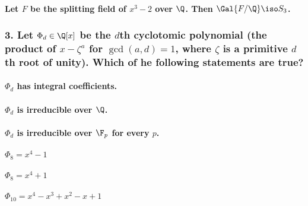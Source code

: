 \paragraph*{Let $F$ be the splitting field of $x^3 - 2$ over $\Q$. Then $\Gal{F / \Q} \iso S_3$.}

\subsubsection*{3. Let $\Phi_d \in \Q[x]$ be the $d$th cyclotomic polynomial (the product of $x - \zeta^a$ for $\gcd(a, d) = 1$, where $\zeta$ is a primitive $d$th root of unity). Which of he following statements are true?}

\paragraph*{$\Phi_d$ has integral coefficients.}

\paragraph*{$\Phi_d$ is irreducible over $\Q$.}

\paragraph*{$\Phi_d$ is irreducible over $\F_p$ for every $p$.}

\paragraph*{$\Phi_8 = x^4 - 1$}

\paragraph*{$\Phi_8 = x^4 + 1$}

\paragraph*{$\Phi_{10} = x^4 - x^3 + x^2 - x + 1$}

